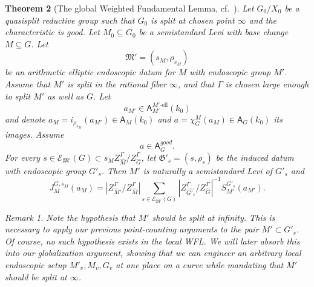 \documentclass[openany]{amsbook}
\newtheorem{theorem}{Theorem}[chapter]
\theoremstyle{definition}
\theoremstyle{remark}
\newtheorem{remark}[theorem]{Remark}
\numberwithin{equation}{section}
\newcommand{\cE}{\mathcal{E}}
\renewcommand{\-}{\operatorname{-}}
\newcommand{\good}{\mathit{good}}
\newcommand{\el}{\text{-ell}}
\newcommand{\bA}{\mathsf{A}}
\newcommand{\fM}{\mathfrak{M}}
\newcommand{\fG}{\mathfrak{G}}
\begin{document}
\begin{theorem}[{The global Weighted Fundamental Lemma, cf.\ \cite[Th\'eor\`eme 15.1.1]{CLII}}]\label{thm.global.wfl}
    Let $G_0/X_0$ be a quasisplit reductive group such that $G_0$ is split at chosen point $\infty$ and the characteristic is good. Let $M_0 \subseteq G_0$ be a semistandard Levi with base change $M \subseteq G$. Let 
    $$
        \fM' = (s_M, \rho_{s_M})
    $$
    be an arithmetic elliptic endoscopic datum for $M$ with endoscopic group $M'$. Assume that $M'$ is split in the rational fiber $\infty$, and that $\Gamma$ is chosen large enough to split $M'$ as well as $G$. Let
    $$
        a_{M'} \in \bA_{M'}^{M'\el}(k_0)
    $$
    and denote $a_M = i_{\rho_{s_M}}(a_{M'}) \in \bA_{M}(k_0)$ and $a = \chi_G^M(a_M) \in \bA_G(k_0)$ its images. Assume 
    $$
        a \in \bA_G^{\good}.
    $$
    For every $s \in \cE_{\fM'}(G) \subset s_M Z_{\widehat{M}}^\Gamma/Z_{\widehat{G}}^\Gamma$, let $\fG'_s = (s, \rho_s)$ be the induced datum with endoscopic group $G'_s$. Then $M'$ is naturally a semistandard Levi of $G'_s$ and
    $$
        J^{G,{s_M}}_M(a_M) = |Z^\Gamma_{\widehat{M}'}/ Z_{\widehat{M}}^\Gamma| \sum_{s \in \cE_{\fM'}(G)} |Z_{\widehat{G'_s}}^\Gamma/ Z_{\widehat{G}}^\Gamma |^{-1} S_{M'}^{G'_s}(a_{M'}).
    $$

\begin{remark}\label{rmk.M'.split.at.infty}
    Note the hypothesis that $M'$ should be split at infinity. This is necessary to apply our previous point-counting arguments to the pair $M' \subset G'_s$. Of course, no such hypothesis exists in the local WFL. We will later absorb this into our globalization argument, showing that we can engineer an arbitrary local endoscopic setup $M'_v, M_v, G_v$ at one place on a curve while mandating that $M'$ should be split at $\infty$.
\end{remark}


\end{theorem}
\end{document}
